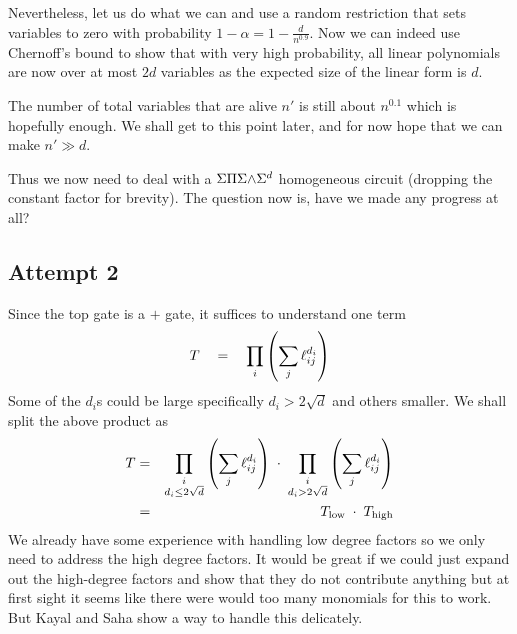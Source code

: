Nevertheless, let us do what we can and use a random restriction that sets variables to zero with probability $1 - \alpha = 1 - \frac{d}{n^{0.9}}$.
Now we can indeed use Chernoff's bound to show that with very high probability, all linear polynomials are now over at most $2d$ variables as the expected size of the linear form is $d$.

The number of total variables that are alive $n'$ is still about $n^{0.1}$ which is hopefully enough.
We shall get to this point later, and for now hope that we can make $n' \gg d$. 

Thus we now need to deal with a $\Sigma\Pi\Sigma\mathord{\wedge}\Sigma^{d}$ homogeneous circuit (dropping the constant factor for brevity).
The question now is, have we made any progress at all?


\subsection*{Attempt 2}

Since the top gate is a $+$ gate, it suffices to understand one term 
\[
T \quad = \quad \prod_{i} \left(\sum_j \ell_{ij}^{d_i}\right)
\]
Some of the $d_i$s could be large specifically $d_i > 2\sqrt{d}$ and others smaller. We shall split the above product as
\begin{eqnarray*}
T &=& \prod_{\substack{i\\d_i \leq 2\sqrt{d}}} \left(\sum_j \ell_{ij}^{d_i}\right) \; \cdot \; \prod_{\substack{i\\d_i > 2\sqrt{d}}} \left(\sum_j \ell_{ij}^{d_i}\right)\\
  & = & T_{\text{low}} \; \cdot \; T_{\text{high}}
\end{eqnarray*}
We already have some experience with handling low degree factors so we only need to address the high degree factors.
It would be great if we could just expand out the high-degree factors and show that they do not contribute anything but at first sight it seems like there were would too many monomials for this to work.
But Kayal and Saha \cite{KayalSaha14} show a way to handle this delicately. 

